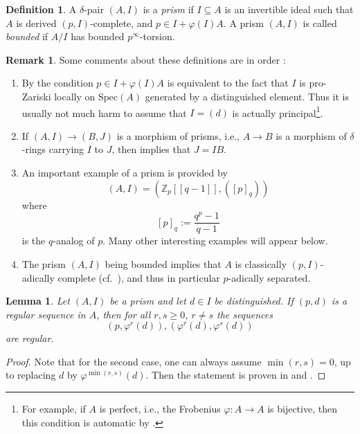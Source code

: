\documentclass{amsart}
\theoremstyle{plain}
\newtheorem{lemma}[theorem]{Lemma}
\theoremstyle{definition}
\newtheorem{definition}[theorem]{Definition}
\newtheorem{remark}[theorem]{Remark}
\newcommand{\Spec}{\mathrm{Spec}}
\newcommand{\Z}{\mathbb{Z}}
\newcommand{\red}[1]{{\color{black} #1}}
\begin{document}
\begin{definition}
  \label{sec:generalities-prisms-definition-prism}
  A $\delta$-pair $(A,I)$ is a \textit{prism} if $I\subseteq A$ is an invertible ideal such that $A$ is derived $(p,I)$-complete, and $p\in I+\varphi(I)A$. A prism $(A,I)$ is called \textit{bounded} if $A/I$ has bounded $p^\infty$-torsion.
\end{definition}

\begin{remark}
  \label{remarks-after-definition-prism}
  Some comments about these definitions are in order :
\begin{enumerate}
\item By \cite[Lemma 3.1]{bhatt_scholze_prisms_and_prismatic_cohomology} the condition $p\in I+\varphi(I)A$ is equivalent to the fact that $I$ is pro-Zariski locally on $\Spec(A)$ generated by a distinguished element.
Thus it is usually not much harm to assume that $I=(d)$ is actually principal\footnote{For example, if $A$ is perfect, i.e., the Frobenius $\varphi\colon A\to A$ is bijective, then this condition is automatic by \cite[Lemma 3.7]{bhatt_scholze_prisms_and_prismatic_cohomology}.}.
\item If $(A,I)\to (B,J)$ is a morphism of prisms, i.e., $A\to B$ is a morphism of $\delta$-rings carrying $I$ to $J$, then \cite[Lemma 3.5]{bhatt_scholze_prisms_and_prismatic_cohomology} implies that $J=IB$.
\item An important example of a prism is provided by
$$
(A,I)=(\Z_p[[q-1]],([p]_q))
$$
where
$$
[p]_q:=\frac{q^p-1}{q-1}
$$
is the $q$-analog of $p$. Many other interesting examples will appear below.
\item The prism $(A,I)$ being bounded implies that $A$ is classically $(p,I)$-adically complete (cf.\ \cite[Exercise 3.4]{bhatt_lectures_on_prismatic_cohomology}), and thus in particular $p$-adically separated.
\end{enumerate}
\end{remark}

\begin{lemma}
  \label{sec:concr-pres-prism-lemma-regular-sequence-for-transversal-prism}
  Let $(A,I)$ be a prism and let $d\in I$ be distinguished. If $(p,d)$ is a regular sequence in $A$, then for all $r,s\geq 0$, $r\neq s$ the sequences
  $$
  (p,\varphi^r(d)),(\varphi^r(d),\varphi^s(d))
  $$
  are regular.
\end{lemma}
\begin{proof}
  \red{Note that for the second case, one can always assume $\min(r,s)=0$, up to replacing $d$ by $\varphi^{\min(r,s)}(d)$.} Then the statement is proven in \cite[Lemma 3.3]{anschuetz_le_bras_the_cyclotomic_trace_in_degree_2} and \cite[Lemma 3.6]{anschuetz_le_bras_the_cyclotomic_trace_in_degree_2}.
\end{proof}
\end{document}
